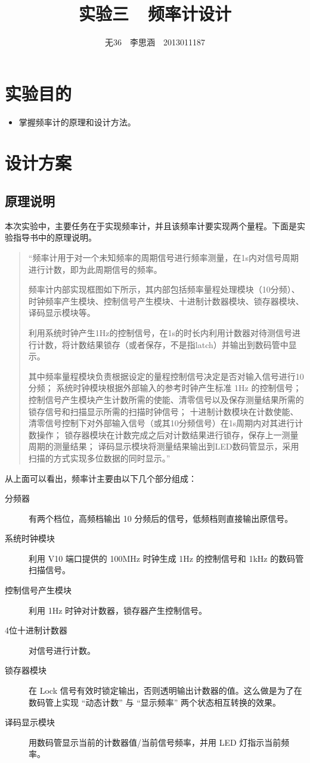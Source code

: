 \documentclass[11pt,a4paper]{article}
\begin{document}
\title{实验三\ \ 频率计设计}
\author{无36$\quad$李思涵$\quad$2013011187}
\maketitle

\section{实验目的}
\begin{itemize}
  \item 掌握频率计的原理和设计方法。
\end{itemize}

\section{设计方案}
\subsection{原理说明}
本次实验中，主要任务在于实现频率计，并且该频率计要实现两个量程。下面是实验指导书中的原理说明。

\begin{quotation}
“频率计用于对一个未知频率的周期信号进行频率测量，在1s内对信号周期进行计数，即为此周期信号的频率。

频率计内部实现框图如下所示，其内部包括频率量程处理模块（10分频）、时钟频率产生模块、控制信号产生模块、十进制计数器模块、锁存器模块、译码显示模块等。

利用系统时钟产生1Hz的控制信号，在1s的时长内利用计数器对待测信号进行计数，将计数结果锁存（或者保存，不是指latch）并输出到数码管中显示。

其中频率量程模块负责根据设定的量程控制信号决定是否对输入信号进行10分频；
系统时钟模块根据外部输入的参考时钟产生标准 1Hz 的控制信号；
控制信号产生模块产生计数所需的使能、清零信号以及保存测量结果所需的锁存信号和扫描显示所需的扫描时钟信号；
十进制计数模块在计数使能、清零信号控制下对外部输入信号（或其10分频信号）在1s周期内对其进行计数操作；
锁存器模块在计数完成之后对计数结果进行锁存，保存上一测量周期的测量结果；
译码显示模块将测量结果输出到LED数码管显示，采用扫描的方式实现多位数据的同时显示。”
\end{quotation}

从上面可以看出，频率计主要由以下几个部分组成：

\begin{description}
  \item[分频器] 有两个档位，高频档输出 10 分频后的信号，低频档则直接输出原信号。
  \item[系统时钟模块] 利用 V10 端口提供的 100MHz 时钟生成 1Hz 的控制信号和 1kHz 的数码管扫描信号。
  \item[控制信号产生模块] 利用 1Hz 时钟对计数器，锁存器产生控制信号。
  \item[4位十进制计数器] 对信号进行计数。
  \item[锁存器模块] 在 Lock 信号有效时锁定输出，否则透明输出计数器的值。这么做是为了在数码管上实现 “动态计数” 与 “显示频率” 两个状态相互转换的效果。
  \item[译码显示模块] 用数码管显示当前的计数器值/当前信号频率，并用 LED 灯指示当前频率。
\end{description}
\end{document}
